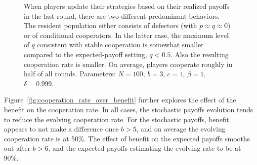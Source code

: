 \documentclass[11pt]{article}
\theoremstyle{plainCl1}
\theoremstyle{plainCl2}
\begin{document}
\begin{figure}[!htbp]
{    When players update their strategies based on their realized payoffs in the last
    round, there are two different predominant behaviors. The resident population
    either consists of defectors (with $p\!\approx\!q\!\approx\!0$) or of
    conditional cooperators. In the latter case, the maximum level of $q$ consistent
    with stable cooperation is somewhat smaller compared to the expected-payoff
    setting, $q\!<\!0.5$. Also the resulting cooperation rate is smaller. On
    average, players cooperate roughly in half of all rounds. Parameters:
    $N\!=\!100$, $b\!=\!3$, $c\!=\!1$, $\beta\!=\!1$, $\delta\!=\!0.999$.}
    \label{fig:expected_and_stochastic_for_donation}
\end{figure}

Figure~\ref{fig:cooperation_rate_over_benefit} further explores the effect of the
benefit on the cooperation rate. In all cases, the stochastic payoffs evolution
tends to reduce the evolving cooperation rate. For the stochastic payoffs,
benefit appears to not make a difference once \(b > 5\), and on average
the evolving cooperation rate is at 50\%. The effect of benefit on the expected
payoffs smooths out after \(b > 6\), and the expected payoffs estimating
the evolving rate to be at 90\%.
\end{document}
